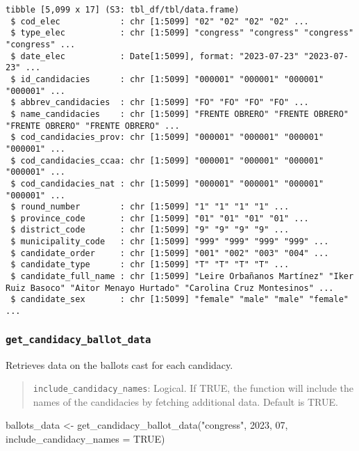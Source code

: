 \documentclass[
  letterpaper,
  DIV=11,
  numbers=noendperiod]{scrreprt}
\newenvironment{Shaded}{\begin{snugshade}}{\end{snugshade}}
\newcommand{\AttributeTok}[1]{\textcolor[rgb]{0.40,0.45,0.13}{#1}}
\newcommand{\ConstantTok}[1]{\textcolor[rgb]{0.56,0.35,0.01}{#1}}
\newcommand{\DecValTok}[1]{\textcolor[rgb]{0.68,0.00,0.00}{#1}}
\newcommand{\FunctionTok}[1]{\textcolor[rgb]{0.28,0.35,0.67}{#1}}
\newcommand{\NormalTok}[1]{\textcolor[rgb]{0.00,0.23,0.31}{#1}}
\newcommand{\OtherTok}[1]{\textcolor[rgb]{0.00,0.23,0.31}{#1}}
\newcommand{\StringTok}[1]{\textcolor[rgb]{0.13,0.47,0.30}{#1}}
\begin{document}
\begin{verbatim}
tibble [5,099 x 17] (S3: tbl_df/tbl/data.frame)
 $ cod_elec            : chr [1:5099] "02" "02" "02" "02" ...
 $ type_elec           : chr [1:5099] "congress" "congress" "congress" "congress" ...
 $ date_elec           : Date[1:5099], format: "2023-07-23" "2023-07-23" ...
 $ id_candidacies      : chr [1:5099] "000001" "000001" "000001" "000001" ...
 $ abbrev_candidacies  : chr [1:5099] "FO" "FO" "FO" "FO" ...
 $ name_candidacies    : chr [1:5099] "FRENTE OBRERO" "FRENTE OBRERO" "FRENTE OBRERO" "FRENTE OBRERO" ...
 $ cod_candidacies_prov: chr [1:5099] "000001" "000001" "000001" "000001" ...
 $ cod_candidacies_ccaa: chr [1:5099] "000001" "000001" "000001" "000001" ...
 $ cod_candidacies_nat : chr [1:5099] "000001" "000001" "000001" "000001" ...
 $ round_number        : chr [1:5099] "1" "1" "1" "1" ...
 $ province_code       : chr [1:5099] "01" "01" "01" "01" ...
 $ district_code       : chr [1:5099] "9" "9" "9" "9" ...
 $ municipality_code   : chr [1:5099] "999" "999" "999" "999" ...
 $ candidate_order     : chr [1:5099] "001" "002" "003" "004" ...
 $ candidate_type      : chr [1:5099] "T" "T" "T" "T" ...
 $ candidate_full_name : chr [1:5099] "Leire Orbañanos Martínez" "Iker Ruiz Basoco" "Aitor Menayo Hurtado" "Carolina Cruz Montesinos" ...
 $ candidate_sex       : chr [1:5099] "female" "male" "male" "female" ...
\end{verbatim}

\hypertarget{get_candidacy_ballot_data}{%
\subsubsection{\texorpdfstring{\texttt{get\_candidacy\_ballot\_data}}{get\_candidacy\_ballot\_data}}\label{get_candidacy_ballot_data}}

Retrieves data on the ballots cast for each candidacy.

\begin{quote}
\texttt{include\_candidacy\_names}: Logical. If TRUE, the function will
include the names of the candidacies by fetching additional data.
Default is TRUE.
\end{quote}

\begin{Shaded}
\begin{Highlighting}[]
\NormalTok{ballots\_data }\OtherTok{\textless{}{-}} \FunctionTok{get\_candidacy\_ballot\_data}\NormalTok{(}\StringTok{"congress"}\NormalTok{, }
                                          \DecValTok{2023}\NormalTok{, }
                                          \DecValTok{07}\NormalTok{, }
                                          \AttributeTok{include\_candidacy\_names =} \ConstantTok{TRUE}\NormalTok{)}
\end{Highlighting}
\end{Shaded}
\end{document}

